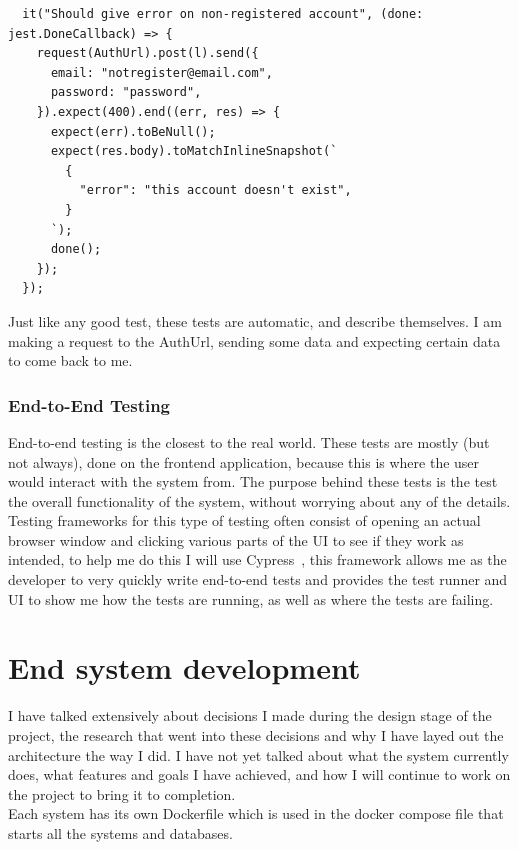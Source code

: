 \documentclass[titlepage]{article}
\begin{document}
\begin{verbatim}
  it("Should give error on non-registered account", (done: jest.DoneCallback) => {
    request(AuthUrl).post(l).send({
      email: "notregister@email.com",
      password: "password",
    }).expect(400).end((err, res) => {
      expect(err).toBeNull();
      expect(res.body).toMatchInlineSnapshot(`
        {
          "error": "this account doesn't exist",
        }
      `);
      done();
    });
  });
\end{verbatim}

Just like any good test, these tests are automatic, and describe themselves. I am making a request to the AuthUrl, sending some data and expecting certain data to come back to me. \\

\subsubsection{End-to-End Testing}
End-to-end testing is the closest to the real world. These tests are mostly (but not always), done on the frontend application, because this is where the user would interact with the system from. The purpose behind these tests is the test the overall functionality of the system, without worrying about any of the details. \\

Testing frameworks for this type of testing often consist of opening an actual browser window and clicking various parts of the UI to see if they work as intended, to help me do this I will use Cypress~\cite{cypress}, this framework allows me as the developer to very quickly write end-to-end tests and provides the test runner and UI to show me how the tests are running, as well as where the tests are failing. 

\section{End system development}
I have talked extensively about decisions I made during the design stage of the project, the research that went into these decisions and why I have layed out the architecture the way I did. I have not yet talked about what the system currently does, what features and goals I have achieved, and how I will continue to work on the project to bring it to completion. \\

Each system has its own Dockerfile which is used in the docker compose file that starts all the systems and databases.
\end{document}
